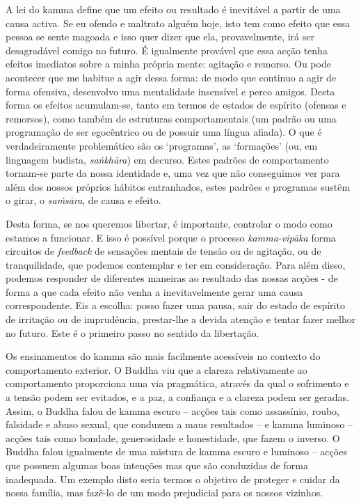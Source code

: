 A lei do kamma define que um efeito ou resultado é inevitável a partir de uma
causa activa. Se eu ofendo e maltrato alguém hoje, isto tem como efeito que essa
pessoa se sente magoada e isso quer dizer que ela, provavelmente, irá ser
desagradável comigo no futuro. É igualmente provável que essa acção tenha
efeitos imediatos sobre a minha própria mente: agitação e remorso. Ou pode
acontecer que me habitue a agir dessa forma: de modo que continuo a agir de
forma ofensiva, desenvolvo uma mentalidade insensível e perco amigos. Desta
forma os efeitos acumulam-se, tanto em termos de estados de espírito (ofensas e
remorsos), como também de estruturas comportamentais (um padrão ou uma
programação de ser egocêntrico ou de possuir uma língua afiada). O que é
verdadeiramente problemático são os `programas', as `formações' (ou, em
linguagem budista, \emph{saṅkhāra}) em decurso. Estes padrões de comportamento
tornam-se parte da nossa identidade e, uma vez que não conseguimos ver para além
dos nossos próprios hábitos entranhados, estes padrões e programas sustêm o
girar, o \emph{saṁsāra}, de causa e efeito.

Desta forma, se nos queremos libertar, é importante, controlar o modo como
estamos a funcionar. E isso é possível porque o processo \emph{kamma-vipāka}
forma circuitos de \emph{feedback} de sensações mentais de tensão ou de
agitação, ou de tranquilidade, que podemos contemplar e ter em consideração.
Para além disso, podemos responder de diferentes maneiras ao resultado das
nossas acções - de forma a que cada efeito não venha a inevitavelmente gerar uma
causa correspondente. Eis a escolha: posso fazer uma pausa, sair do estado de
espírito de irritação ou de imprudência, prestar-lhe a devida atenção e tentar
fazer melhor no futuro. Este é o primeiro passo no sentido da libertação.

Os ensinamentos do kamma são mais facilmente acessíveis no contexto do
comportamento exterior. O Buddha viu que a clareza relativamente ao
comportamento proporciona uma via pragmática, através da qual o sofrimento e a
tensão podem ser evitados, e a paz, a confiança e a clareza podem ser geradas.
Assim, o Buddha falou de kamma escuro -- acções tais como assassínio, roubo,
falsidade e abuso sexual, que conduzem a maus resultados -- e kamma luminoso --
acções tais como bondade, generosidade e honestidade, que fazem o inverso. O
Buddha falou igualmente de uma mistura de kamma escuro e luminoso -- acções que
possuem algumas boas intenções mas que são conduzidas de forma inadequada. Um
exemplo disto seria termos o objetivo de proteger e cuidar da nossa família, mas
fazê-lo de um modo prejudicial para os nossos vizinhos.

